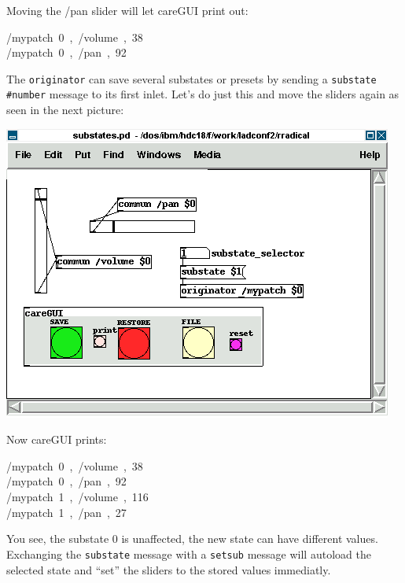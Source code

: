 \documentclass[10pt,english]{scrartcl}
\begin{document}
Moving the /pan slider will let careGUI print out:
\begin{ttfamily}\begin{flushleft}
\mbox{/mypatch~0~,~/volume~,~38}\\
\mbox{/mypatch~0~,~/pan~,~92}
\end{flushleft}\end{ttfamily}

The \texttt{originator} can save several substates or presets by sending a
\texttt{substate {\#}number} message to its first inlet. Let's do just this and
move the sliders again as seen in the next picture:

\includegraphics{substates.png}

Now careGUI prints:
\begin{ttfamily}\begin{flushleft}
\mbox{/mypatch~0~,~/volume~,~38}\\
\mbox{/mypatch~0~,~/pan~,~92}\\
\mbox{/mypatch~1~,~/volume~,~116}\\
\mbox{/mypatch~1~,~/pan~,~27}
\end{flushleft}\end{ttfamily}

You see, the substate 0 is unaffected, the new state can have different
values. Exchanging the \texttt{substate} message with a \texttt{setsub} message will
autoload the selected state and ``set'' the sliders to the stored values
immediatly.



\hypertarget{osc-in-memento}{}
\end{document}
